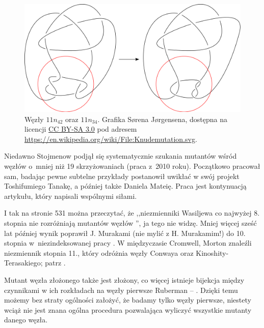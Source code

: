 \begin{figure}[H]
    \centering
    \includegraphics[width=0.601\linewidth]{../data/mixed/knudemutation.png}
    \caption{Węzły $11n_{42}$ oraz $11n_{34}$. Grafika Sørena Jørgensena, dostępna na licencji \href{https://creativecommons.org/licenses/by-sa/3.0/deed.en}{CC BY-SA 3.0} pod adresem \url{https://en.wikipedia.org/wiki/File:Knudemutation.svg}.}
\end{figure}
    
Niedawno Stojmenow podjął się systematycznie szukania mutantów wśród węzłów o~mniej niż 19 skrzyżowaniach (praca \cite{stoimenow2010} z~2010 roku).
%
Początkowo pracował sam, badając pewne subtelne przykłady postanowił uwikłać w swój projekt Toshifumiego Tanakę, a później także Daniela Mateię.
%
%
Praca \cite{stoimenow2010} jest kontynuacją artykułu, który napisali wspólnymi siłami.

I tak na stronie 531 można przeczytać, że ,,niezmienniki Wasiljewa co najwyżej 8. stopnia nie rozróżniają mutantów węzłów \cite{chmutov1994}'', ja tego nie widzę.
%
Mniej więcej sześć lat później wynik poprawił J. Murakami (nie mylić z H. Murakamim!) do 10. stopnia w~niezindeksowanej pracy \cite{murakami1999}.
W międzyczasie Cromwell, Morton znaleźli niezmiennik stopnia 11., który odróżnia węzły Conwaya oraz Kinoshity-Terasakiego; patrz \cite{cromwell1996}.
%
%

Mutant węzła złożonego także jest złożony, co więcej istnieje bijekcja między czynnikami w ich rozkładach na węzły pierwsze Ruberman -- \cite{ruberman1987}.
%
Dzięki temu możemy bez straty ogólności założyć, że badamy tylko węzły pierwsze, niestety wciąż nie jest znana ogólna procedura pozwalająca wyliczyć wszystkie mutanty danego węzła.


